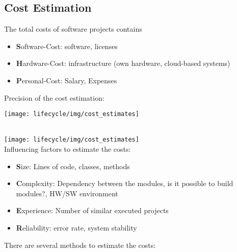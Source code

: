 \subsection{Cost Estimation}
The total costs of software projects contains
\begin{itemize}
\item {\textbf Software-Cost}: software, licenses
\item {\textbf Hardware-Cost}: infrastructure (own hardware, cloud-based systems)
\item {\textbf Personal-Cost}: Salary, Expenses
\end{itemize}
\ifslides
\newpage
\fi
Precision of the cost estimation:
\ifslides
\begin{center}
\texttt{[image: lifecycle/img/cost\_estimates]}\\[2ex]
\end{center}
\else
\\[2ex]
\texttt{[image: lifecycle/img/cost\_estimates]}\\[2ex]
\fi
%
Influencing factors to estimate the costs:
\begin{itemize}
\item {\textbf Size}: Lines of code, classes, methods
\item {\textbf Complexity}: Dependency between the modules, is it possible to build modules?, HW/SW environment
\item {\textbf Experience}: Number of similar executed projects
\item {\textbf Reliability}: error rate, system stability
\end{itemize}
\newpage
There are several methods to estimate the costs:
